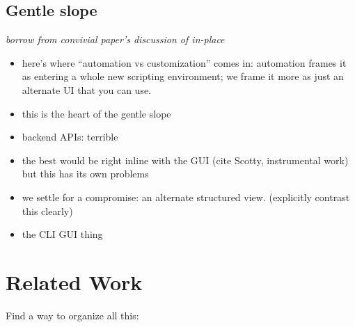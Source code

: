 \documentclass[sigplan,10pt,anonymous,review]{acmart}
\providecommand{\tightlist}{%
  \setlength{\itemsep}{0pt}\setlength{\parskip}{0pt}}
\begin{document}
\hypertarget{gentle-slope}{%
\subsection{Gentle slope}\label{gentle-slope}}

\emph{borrow from convivial paper's discussion of in-place}

\begin{itemize}
\tightlist
\item
  here's where ``automation vs customization'' comes in: automation
  frames it as entering a whole new scripting environment; we frame it
  more as just an alternate UI that you can use.
\item
  this is the heart of the gentle slope
\item
  backend APIs: terrible
\item
  the best would be right inline with the GUI (cite Scotty, instrumental
  work) but this has its own problems
\item
  we settle for a compromise: an alternate structured view. (explicitly
  contrast this clearly)
\item
  the CLI GUI thing
\end{itemize}

\hypertarget{sec:related-work}{%
\section{Related Work}\label{sec:related-work}}

Find a way to organize all this:
\end{document}
